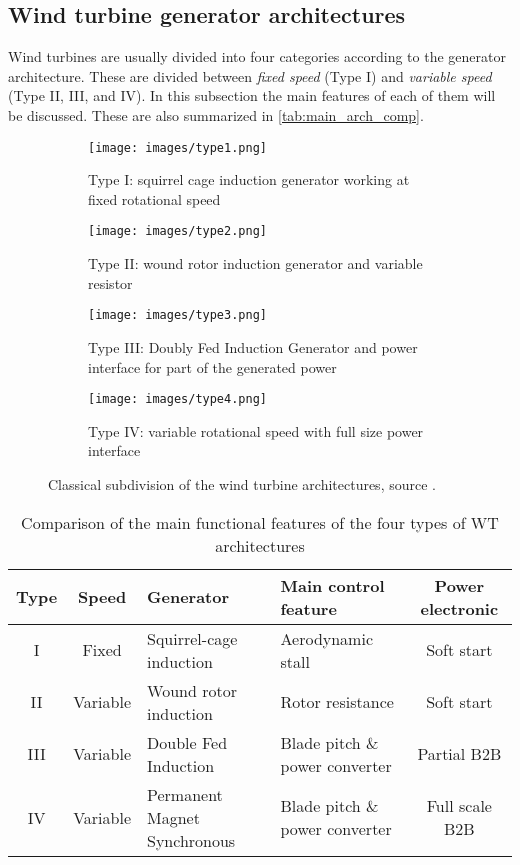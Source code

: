 \subsection{Wind turbine generator architectures}\label{subsec:WT_generator_arch}
Wind turbines are usually divided into four categories according to the generator architecture. These are divided between \textit{fixed speed} (Type I) and \textit{variable speed} (Type II, III, and IV). In this subsection the main features of each of them will be discussed. These are also summarized in \autoref{tab:main_arch_comp}.
\begin{figure}[htb]
  \centering
  \begin{subfigure}{0.49\columnwidth}
    \texttt{[image: images/type1.png]}
    \caption{Type I: squirrel cage induction generator working at fixed rotational speed}
    \label{fig:type1}
  \end{subfigure}
  \begin{subfigure}{0.49\columnwidth}
    \texttt{[image: images/type2.png]}
    \caption{Type II: wound rotor induction generator and variable resistor}
    \label{fig:type2}
  \end{subfigure}
  \begin{subfigure}{0.49\columnwidth}
    \texttt{[image: images/type3.png]}
    \caption{Type III: Doubly Fed Induction Generator and power interface for part of the generated power}
    \label{fig:type3}
  \end{subfigure}
  \begin{subfigure}{0.49\columnwidth}
    \texttt{[image: images/type4.png]}
    \caption{Type IV: variable rotational speed with full size power interface}
    \label{fig:type4}
  \end{subfigure}
  \caption{Classical subdivision of the wind turbine architectures, source \cite{Burman2011IntegratingRE}. }
\end{figure}

\begin{table}[htb]
  \centering
  \begin{tabular}{ccMMc}
    \toprule
  Type & Speed & Generator & Main control feature & Power electronic\\ \midrule
   I & Fixed & Squirrel-cage induction & Aerodynamic stall & Soft start \\ 
   II & Variable & Wound rotor induction &  Rotor resistance & Soft start\\
   III & Variable & Double Fed Induction &  Blade pitch \& power converter & Partial B2B\\
   IV & Variable & Permanent Magnet Synchronous &  Blade pitch \& power converter & Full scale B2B\\
   \bottomrule
  \end{tabular}
  \caption{Comparison of the main functional features of the four types of WT architectures}
  \label{tab:main_arch_comp}
\end{table}

